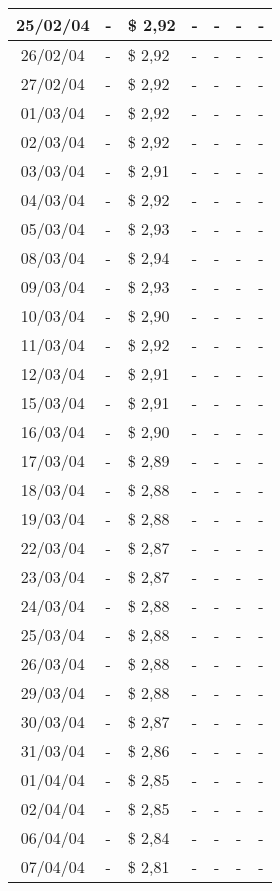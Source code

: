 \begin{center}
\begin{longtable}{|c|p{1.5cm}|p{1.5cm}|p{1.5cm}|p{1.5cm}|p{1.5cm}|p{1.5cm}|}
25/02/04 & - & \$ 2,92 & - & - & - & - \\ \hline
26/02/04 & - & \$ 2,92 & - & - & - & - \\ \hline
27/02/04 & - & \$ 2,92 & - & - & - & - \\ \hline
01/03/04 & - & \$ 2,92 & - & - & - & - \\ \hline
02/03/04 & - & \$ 2,92 & - & - & - & - \\ \hline
03/03/04 & - & \$ 2,91 & - & - & - & - \\ \hline
04/03/04 & - & \$ 2,92 & - & - & - & - \\ \hline
05/03/04 & - & \$ 2,93 & - & - & - & - \\ \hline
08/03/04 & - & \$ 2,94 & - & - & - & - \\ \hline
09/03/04 & - & \$ 2,93 & - & - & - & - \\ \hline
10/03/04 & - & \$ 2,90 & - & - & - & - \\ \hline
11/03/04 & - & \$ 2,92 & - & - & - & - \\ \hline
12/03/04 & - & \$ 2,91 & - & - & - & - \\ \hline
15/03/04 & - & \$ 2,91 & - & - & - & - \\ \hline
16/03/04 & - & \$ 2,90 & - & - & - & - \\ \hline
17/03/04 & - & \$ 2,89 & - & - & - & - \\ \hline
18/03/04 & - & \$ 2,88 & - & - & - & - \\ \hline
19/03/04 & - & \$ 2,88 & - & - & - & - \\ \hline
22/03/04 & - & \$ 2,87 & - & - & - & - \\ \hline
23/03/04 & - & \$ 2,87 & - & - & - & - \\ \hline
24/03/04 & - & \$ 2,88 & - & - & - & - \\ \hline
25/03/04 & - & \$ 2,88 & - & - & - & - \\ \hline
26/03/04 & - & \$ 2,88 & - & - & - & - \\ \hline
29/03/04 & - & \$ 2,88 & - & - & - & - \\ \hline
30/03/04 & - & \$ 2,87 & - & - & - & - \\ \hline
31/03/04 & - & \$ 2,86 & - & - & - & - \\ \hline
01/04/04 & - & \$ 2,85 & - & - & - & - \\ \hline
02/04/04 & - & \$ 2,85 & - & - & - & - \\ \hline
06/04/04 & - & \$ 2,84 & - & - & - & - \\ \hline
07/04/04 & - & \$ 2,81 & - & - & - & - \\ \hline

\end{longtable}
\end{center}

